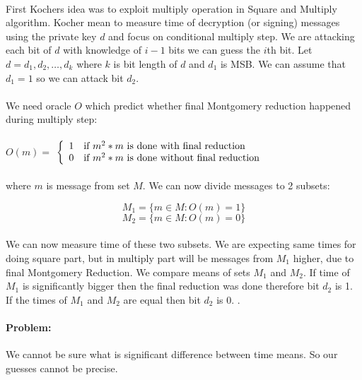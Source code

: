 \documentclass[thesis=B,english]{FITthesis}[2012/10/20]
\begin{document}
{\paragraph*{}{
First Kochers idea was to exploit multiply operation in Square and Multiply algorithm. Kocher mean to measure time of decryption (or signing) messages using the private key \(d\) 
and focus on conditional multiply step. We are attacking each bit of \(d\) with knowledge of \( i-1\) bits we can guess the \(i\)th bit. Let \(d = d_1,d_2, \ldots ,d_k \) where \(k\) is bit length of \(d\) and \(d_1\) is MSB. 
We can assume that \( d_1 = 1\) so we can attack bit \(d_2\).
}
\paragraph*{}{
We need oracle \(O\) which predict whether final Montgomery reduction happened during multiply step:
}
\paragraph*{}

\( O(m) =\) $\left\{
  \begin{array}{cl}
    \text{1} & \text{\mbox{if}  \(m^2 * m\) is done with final reduction} \\
    \text{0} & \text{\mbox{if}  \(m^2 * m\) is done without final reduction} 
  \end{array}
\right.$

\paragraph*{}
{
where \(m\) is message from set \(M\). We can now divide messages to 2 subsets:}

\[M_1 = \{m \in M : O(m) = 1\}\]
\[M_2 = \{m \in M : O(m) = 0\}\]

\paragraph*{}{
We can now measure time of these two subsets. We are expecting same times for doing square part, but in multiply part will be messages from \(M_1\) higher, due to
final Montgomery Reduction. We compare means of sets \(M_1\) and \(M_2\). If time of \(M_1\) is significantly bigger then the final reduction was done therefore bit \(d_2\)
is 1. If the times of \(M_1\) and \(M_2\) are equal then bit \(d_2\) is 0. . }

\paragraph*{Problem:}{
We cannot be sure what is significant difference between time means. So our guesses cannot be precise.}

}
\end{document}
